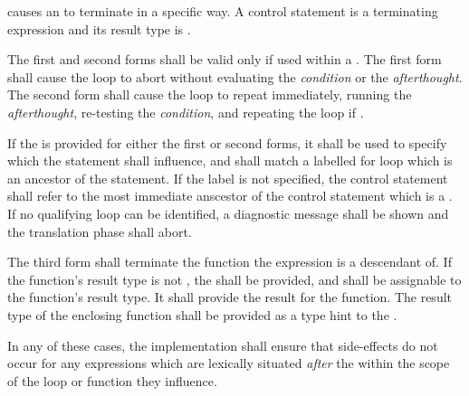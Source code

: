 \specsubsubitem
{} causes an  to
terminate in a specific way. A control statement is a terminating expression
and its result type is .

\specsubsubitem
The first and second forms shall be valid only if used within a
. The first form shall cause the loop to abort without
evaluating the \textit{condition} or the \textit{afterthought}. The second form
shall cause the loop to repeat immediately, running the \textit{afterthought},
re-testing the \textit{condition}, and repeating the loop if .

\specsubsubitem
If the  is provided for either the first or second forms, it
shall be used to specify which  the statement shall
influence, and shall match a labelled for loop which is an ancestor of the
statement. If the label is not specified, the control statement shall refer to
the most immediate anscestor of the control statement which is a
. If no qualifying loop can be identified, a diagnostic
message shall be shown and the translation phase shall abort.

\specsubsubitem
The third form shall terminate the function the expression is a descendant of.
If the function's result type is not , the
 shall be provided, and shall be assignable to the
function's result type. It shall provide the result for the function. The
result type of the enclosing function shall be provided as a type hint to the
.

\specsubsubitem
In any of these cases, the implementation shall ensure that side-effects do not
occur for any expressions which are lexically situated \textit{after} the
 within the scope of the loop or function they
influence.


